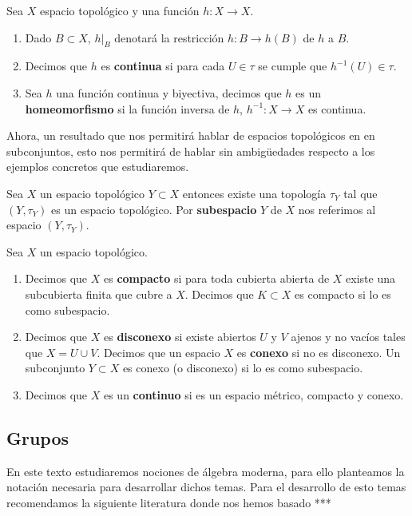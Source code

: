 \begin{df}
Sea $X$ espacio topológico y una función $h:X \to X$. 
\begin{enumerate}

	\item Dado  $B \subset X$, $h|_B$ denotará la restricción $h:B \to h(B)$ de $h$ a $B$. 
	
	\item  Decimos que $h$ es \textbf{continua} si para cada $U \in \tau$ se cumple que $h^{-1}(U) \in \tau$.
	
	\item  Sea $h$ una función continua y biyectiva, decimos que $h$ es un \textbf{homeomorfismo} si la función inversa de $h$, $h^{-1}:X \to X$ es continua. 
	
\end{enumerate}
\end{df}

Ahora, un resultado que nos permitirá hablar de espacios topológicos en en subconjuntos, esto nos permitirá de hablar sin ambigüedades respecto a los ejemplos concretos que estudiaremos. 

\begin{te}
Sea $X$ un espacio topológico $Y \subset X$ entonces existe una topología $\tau_Y$ tal que $(Y,\tau_Y)$ es un espacio topológico. Por \textbf{subespacio} $Y$ de $X$ nos referimos al espacio $(Y, \tau_Y)$.
\end{te}

\begin{df}
Sea $X$ un espacio topológico.
\begin{enumerate}
	\item  Decimos que $X$ es \textbf{compacto} si para toda cubierta abierta de $X$ existe una subcubierta finita que cubre a $X$. Decimos que $K \subset X$ es compacto si lo es como subespacio.
	\item Decimos que $X$ es \textbf{disconexo} si existe abiertos $U$ y $V$ ajenos y no vacíos tales que $X = U \cup V$. Decimos que un espacio $X$ es \textbf{conexo} si no es disconexo. Un subconjunto $Y \subset X$ es conexo (o disconexo) si lo es como subespacio.
	
	\item Decimos que $X$ es un \textbf{continuo} si es un espacio métrico, compacto y conexo.
\end{enumerate}
\end{df}

\subsection*{Grupos}
En este texto estudiaremos nociones de álgebra moderna, para ello planteamos la notación necesaria para desarrollar dichos temas. Para el desarrollo de esto temas recomendamos la siguiente literatura donde nos hemos basado ***

